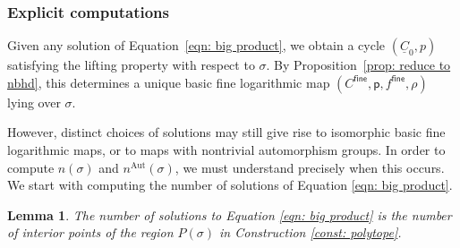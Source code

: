 \documentclass{article}
\newtheorem{lemma}[definition]{Lemma}
\newcommand{\nn}{n^{\operatorname{Aut}}}
\begin{document}
\subsubsection{Explicit computations}\label{sec: computations}


Given any solution of Equation~\eqref{eqn: big product}, we obtain a cycle $(\underline{C}_0, p)$ satisfying the lifting property with respect to $\sigma$. By Proposition~\ref{prop: reduce to nbhd}, this determines a unique basic fine logarithmic map $(C^{\mathsf{fine}}, \mathsf{p}, f^{\mathsf{fine}}, \rho)$ lying over $\sigma$.

However, distinct choices of solutions may still give rise to isomorphic basic fine logarithmic maps, or to maps with nontrivial automorphism groups. In order to compute $n(\sigma)$ and $\nn(\sigma)$, we must understand precisely when this occurs. We start with computing the number of solutions of Equation \eqref{eqn: big product}.

\begin{lemma}\label{lemma: solution_interior_points}
     The number of solutions to Equation \eqref{eqn: big product} is the number of interior points of the region $P(\sigma)$ in Construction \ref{const: polytope}. 
\end{lemma}
\end{document}
